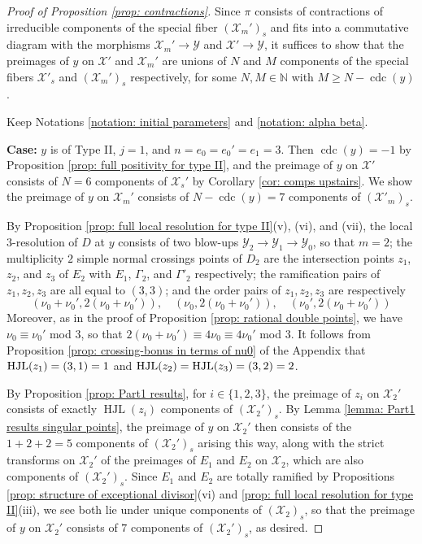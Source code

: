 \documentclass[12pt]{amsart}
\numberwithin{equation}{section}
\theoremstyle{definition}
\newcommand{\N}{\mathbb N}
\newcommand{\X}{\mathcal{X}}
\newcommand{\Y}{\mathcal{Y}}
\let\L\relax
\DeclareMathOperator{\cdc}{cdc}
\DeclareMathOperator{\HJL}{HJL}
\DeclareMathOperator{\L}{L}
\begin{document}
\begin{proof}[Proof of Proposition \ref{prop: contractions}]
    Since $\pi$ consists of contractions of irreducible components of the special fiber $(\X_m')_s$ and fits into a commutative diagram with the morphisms $\X_m'\to\Y$ and $\X'\to\Y$, it suffices to show that the preimages of $y$ on $\X'$ and $\X_m'$ are unions of $N$ and $M$ components of the special fibers $\X'_s$ and $(\X_m')_s$ respectively, for some $N,M\in\N$ with $M\geq N-\cdc(y)$.

    Keep Notations \ref{notation: initial parameters} and \ref{notation: alpha beta}.

    \textbf{Case:} $y$ is of Type II, $j=1$, and $n=e_0=e_0'=e_1=3$. Then $\cdc(y)=-1$ by Proposition \ref{prop: full positivity for type II}, and the preimage of $y$ on $\X'$ consists of $N=6$ components of $\X_s'$ by Corollary \ref{cor: comps upstairs}. We show the preimage of $y$ on $\X_m'$ consists of $N-\cdc(y)=7$ components of $(\X'_m)_s$.
    
    By Proposition \ref{prop: full local resolution for type II}(v), (vi), and (vii), the local $3$-resolution of $D$ at $y$ consists of two blow-ups $\Y_2\to\Y_1\to\Y_0$, so that $m=2$; the multiplicity $2$ simple normal crossings points of $D_2$ are the intersection points $z_1$, $z_2$, and $z_3$ of $E_2$ with $E_1$, $\Gamma_2$, and $\Gamma'_2$ respectively; the ramification pairs of $z_1,z_2,z_3$ are all equal to $(3,3)$; and the order pairs of $z_1,z_2,z_3$ are respectively 
    \[(\nu_0+\nu_0',2(\nu_0+\nu_0')),\quad (\nu_0,2(\nu_0+\nu_0')),\quad (\nu_0',2(\nu_0+\nu_0'))\]
    Moreover, as in the proof of Proposition \ref{prop: rational double points}, we have $\nu_0\equiv \nu_0'$ mod $3$, so that $2(\nu_0+\nu_0')\equiv 4\nu_0\equiv 4\nu_0'$ mod $3$. It follows from Proposition \ref{prop: crossing-bonus in terms of nu0} of the Appendix that $\HJL(z_1)=\L(3,1)=1$ and $\HJL(z_2)=\HJL(z_3)=\L(3,2)=2$. 
    
    By Proposition \ref{prop: Part1 results}, for $i\in\{1,2,3\}$, the preimage of $z_i$ on $\X_2'$ %
    consists of exactly $\HJL(z_i)$ components of $(\X_2')_s$. By Lemma \ref{lemma: Part1 results singular points}, the preimage of $y$ on $\X_2'$ then consists of the $1+2+2=5$ components of $(\X_2')_s$ arising this way, along with the strict transforms on $\X_2'$ of the preimages of $E_1$ and $E_2$ on $\X_2$, which are also components of $(\X_2')_s$. Since $E_1$ and $E_2$ are totally ramified by Propositions \ref{prop: structure of exceptional divisor}(vi) and \ref{prop: full local resolution for type II}(iii), we see both lie under unique components of $(\X_2)_s$, so that the preimage of $y$ on $\X_2'$ consists of $7$ components of $(\X_2')_s$, as desired.


\end{proof}
\end{document}
